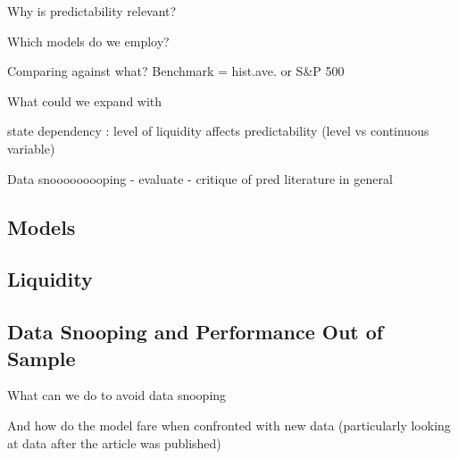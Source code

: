 
Why is predictability relevant?

Which models do we employ?

Comparing against what? Benchmark = hist.ave. or S\&P 500

What could we expand with

state dependency : level of liquidity affects predictability (level vs continuous variable)

Data snooooooooping - evaluate - critique of pred literature in general

\subsection{Models}

\subsection{Liquidity}

\subsection{Data Snooping and Performance Out of Sample}

What can we do to avoid data snooping 

And how do the model fare when confronted with new data (particularly looking at data after the article was published)


